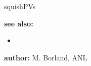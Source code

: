 \begin{sddsprog}{squishPVs}
\item \textbf{see also:}
    \begin{itemize}
    \item {}
    \end{itemize}
\item \textbf{author:} M. Borland, ANL 
\end{sddsprog}
